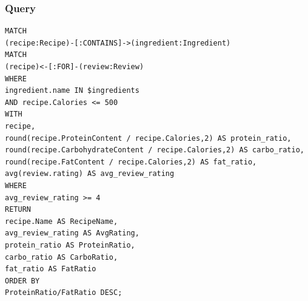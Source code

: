 \begin{enumerate}
    \subsubsection{Query}
    \begin{verbatim}
MATCH 
(recipe:Recipe)-[:CONTAINS]->(ingredient:Ingredient)
MATCH 
(recipe)<-[:FOR]-(review:Review)
WHERE 
ingredient.name IN $ingredients 
AND recipe.Calories <= 500
WITH 
recipe, 
round(recipe.ProteinContent / recipe.Calories,2) AS protein_ratio,
round(recipe.CarbohydrateContent / recipe.Calories,2) AS carbo_ratio,
round(recipe.FatContent / recipe.Calories,2) AS fat_ratio,
avg(review.rating) AS avg_review_rating
WHERE 
avg_review_rating >= 4
RETURN 
recipe.Name AS RecipeName, 
avg_review_rating AS AvgRating, 
protein_ratio AS ProteinRatio, 
carbo_ratio AS CarboRatio, 
fat_ratio AS FatRatio
ORDER BY 
ProteinRatio/FatRatio DESC;
    \end{verbatim}

\end{enumerate}
